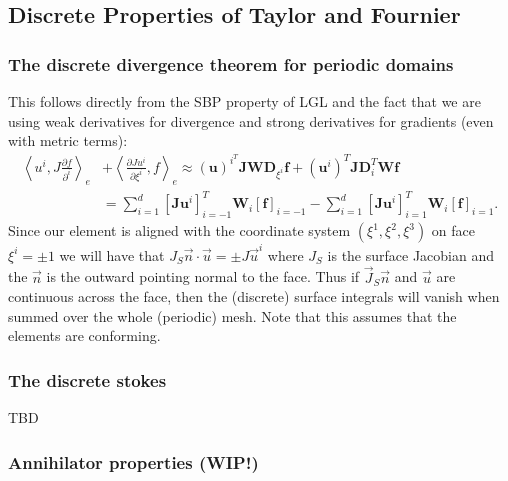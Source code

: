 \documentclass{report}
\newcommand{\inner}[2]{ \left\langle #1, #2 \right\rangle }
\newcommand{\mat}[1]{\boldsymbol #1}
\newcommand{\dvec}[1]{\boldsymbol #1}
\begin{document}
\subsection*{Discrete Properties of Taylor and Fournier}

\subsubsection*{The discrete divergence theorem for periodic domains}

This follows directly from the SBP property of LGL and the fact that we are using weak
derivatives for divergence and strong derivatives for gradients (even with metric terms):
\begin{align}
   \inner{u^{i}}{J \frac{\partial f}{\partial^{i}}}_{e}
   &+
   \inner{\frac{\partial Ju^{i}}{\partial \xi^{i}}}{f}_{e}
   \approx
   {\left(\dvec{u}\right)}^{i}^{T} \mat{J} \mat{W} \mat{D}_{\xi^i} \dvec{f}
   +
   {\left(\dvec{u}^{i}\right)}^{T} \mat{J} \mat{D}^{T}_{i} \mat{W} \dvec{f}
   \nonumber\\
   &=
   \sum_{i=1}^{d} {\left[\mat{J}\dvec{u}^{i}\right]}_{i=-1}^{T} \mat{W}_{i} {\left[\dvec{f}\right]}_{i=-1}
   -
   \sum_{i=1}^{d} {\left[\mat{J}\dvec{u}^{i}\right]}_{i=1}^{T} \mat{W}_{i} {\left[\dvec{f}\right]}_{i=1}.
\end{align}
Since our element is aligned with the coordinate system $(\xi^{1}, \xi^{2}, \xi^{3})$
on face $\xi^{i} = \pm 1$ we will have that $J_{S} \vec{n} \cdot \vec{u} = \pm J \vec{u}^{i}$
where $J_{S}$ is the surface Jacobian and the $\vec{n}$ is the outward pointing normal to the face.
Thus if $\vec{J}_{S} \vec{n}$ and $\vec{u}$ are continuous across the face, then the (discrete)
surface integrals will vanish when summed over the whole (periodic) mesh.
Note that this assumes that the elements are conforming.

\subsubsection*{The discrete stokes}

TBD

\subsubsection*{Annihilator properties (WIP!)}
\end{document}
